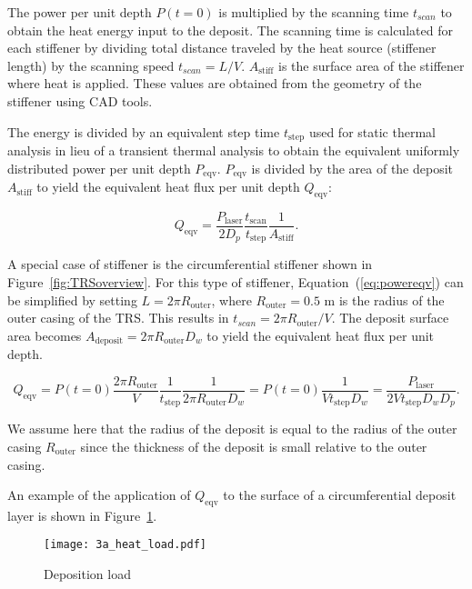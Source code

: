 The power per unit depth $P(t=0)$ is multiplied by the scanning time $t_{scan}$ to obtain the heat energy input to the deposit. The scanning time is calculated for each stiffener by dividing total distance traveled by the heat source (stiffener length) by the scanning speed $t_{scan} = L/V$. $A_{\textrm{stiff}}$ is the surface area of the stiffener where heat is applied. These values are obtained from the geometry of the stiffener using \ac{CAD} tools.

The energy is divided by an equivalent step time $t_{\textrm{step}}$ used for static thermal analysis in lieu of a transient thermal analysis to obtain the equivalent uniformly distributed power per unit depth $P_{\textrm{eqv}}$. $P_{\textrm{eqv}}$ is divided by the area of the deposit $A_{\textrm{stiff}}$ to yield the equivalent heat flux per unit depth $Q_{\textrm{eqv}}$:

\begin{equation}
	\label{eq:powereqv}
	Q_{\textrm{eqv}} = \dfrac{P_{\textrm{laser}}}{2D_{p}}\dfrac{t_{\textrm{scan}}}{t_{\textrm{step}}}\dfrac{1}{A_{\textrm{stiff}}}.
\end{equation}

A special case of stiffener is the circumferential stiffener shown in Figure~\ref{fig:TRSoverview}. For this type of stiffener, Equation~(\ref{eq:powereqv}) can be simplified by setting $L = 2\pi R_{\textrm{outer}}$, where $R_{\textrm{outer}} = 0.5$ m is the radius of the outer casing of the \ac{TRS}. This results in $t_{scan} = 2\pi R_{\textrm{outer}}/V$. The deposit surface area becomes $A_{\textrm{deposit}} = 2\pi {R_{\textrm{outer}}}D_w$ to yield the equivalent heat flux per unit depth.

\begin{equation}
	\label{eq:powereqvcirc}
	Q_{\textrm{eqv}} = P(t=0)\dfrac{2\pi R_{\textrm{outer}}}{V}\dfrac{1}{t_{\textrm{step}}}\dfrac{1}{2\pi {R_{\textrm{outer}}}D_w} = P(t=0)\dfrac{1}{{V}t_{\textrm{step}}D_w} = \dfrac{P_{\textrm{laser}}}{{2V}t_{\textrm{step}}D_wD_p}.
\end{equation}

We assume here that the radius of the deposit is equal to the radius of the outer casing $R_{\textrm{outer}}$ since the thickness of the deposit is small relative to the outer casing.

An example of the application of $Q_{\textrm{eqv}}$ to the surface of a circumferential deposit layer is shown in Figure~\ref{fig:depload}.

\begin{figure}[h!]
    \centering
    \texttt{[image: 3a\_heat\_load.pdf]}
    \caption{ \label{fig:depload} Deposition load }
\end{figure}

